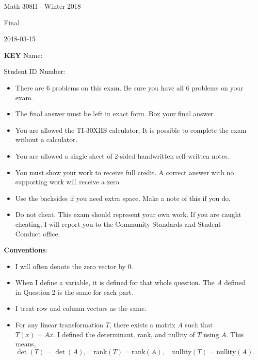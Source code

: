 \documentclass[addpoints]{exam}
\newcommand{\rank}{\mathrm{rank}}
\newcommand{\nullity}{\mathrm{nullity}}
\begin{document}
\begin{center}
    Math 308H - Winter 2018

    Final

    2018-03-15
\end{center}

\ifprintanswers
\textbf{\huge KEY}
\else
Name: \hrulefill

Student ID Number: \hrulefill
\fi

\vspace{0.3cm}

\begin{center}
    \gradetable[v][questions]
\end{center}

\vspace{0.3cm}

\begin{itemize}
    \item
        There are 6 problems on this exam. Be sure you have all 6 problems on
        your exam.
    \item
        The final answer must be left in exact form. Box your final answer.
    \item
        You are allowed the TI-30XIIS calculator. It is possible to complete
        the exam without a calculator.
    \item
        You are allowed a single sheet of 2-sided handwritten self-written notes.
    \item
        You must show your work to receive full credit. A correct answer
        with no supporting work will receive a zero.
    \item
        Use the backsides if you need extra space. Make a note of this if you
        do.
    \item
        Do not cheat. This exam should represent your own work. If you are
        caught cheating, I will report you to the Community Standards and
        Student Conduct office.
\end{itemize}

\textbf{Conventions}:
\begin{itemize}
    \item
        I will often denote the zero vector by $0$.
    \item
        When I define a variable, it is defined for that whole question. The $A$
        defined in Question 2 is the same for each part.
    \item
        I treat row and column vectors as the same.
    \item
        For any linear transformation $T$, there exists a matrix $A$ such that
        $T(x)=Ax$. I defined the determinant, rank, and nullity of $T$ using
        $A$. This means,
        \[
            \det(T)=\det(A), \quad \rank(T)=\rank(A), \quad \nullity(T)=\nullity(A).
        \]
\end{itemize}
\end{document}
